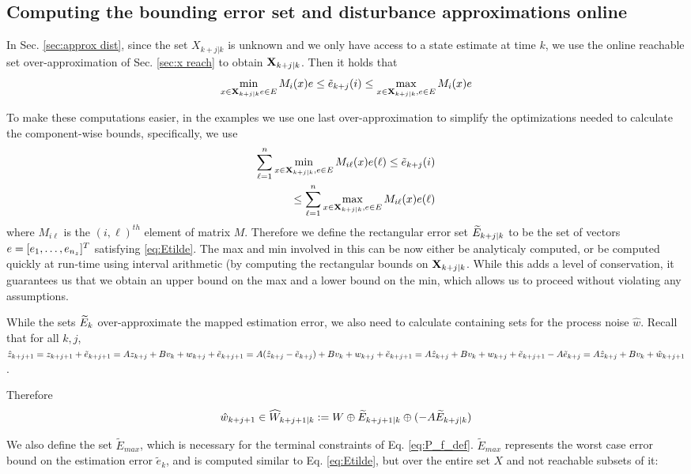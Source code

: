 \subsection{Computing the bounding error set and disturbance approximations online}

In Sec. \ref{sec:approx dist}, since the set $X_{k+j|k}$ is unknown and we only have access to a state estimate at time $k$, we use the online reachable set over-approximation of Sec. \ref{sec:x reach} to obtain $\mathbf{X}_{k+j|k}$.
Then it holds that 
\[\min_{x \in \mathbf{X}_{k+j|k} e \in E}M_i(x)e \leq \tilde{e}_{k+j}(i) \leq \max_{x \in \mathbf{X}_{k+j|k}, e \in E} M_i(x)e\]

To make these computations easier, in the examples we use one last over-approximation to simplify the optimizations needed to calculate the component-wise bounds, specifically, we use 
\begin{eqnarray}
\label{eq:Etilde}
\sum_{\ell=1}^{n} \min_{x \in \mathbf{X}_{k+j|k}, e \in E} M_{i\ell}(x)e(\ell)  \leq \tilde{e}_{k+j}(i) 
\nonumber 
\\
\leq \sum_{\ell=1}^{n} \max_{x \in \mathbf{X}_{k+j|k}, e \in E} M_{i\ell}(x)e(\ell)
\end{eqnarray}
where $M_{i\ell}$ is the $(i,\ell)^{th}$ element of matrix $M$.
Therefore we define the rectangular error set $\widetilde{E}_{k+j|k}$ to be the set of vectors $e = [e_1,\ldots, e_{n_z}]^T$ satisfying \eqref{eq:Etilde}. The max and min involved in this can be now either be analyticaly computed, or be computed quickly at run-time using interval arithmetic (by computing the rectangular bounds on $\mathbf{X}_{k+j|k}$. While this adds a level of conservation, it guarantees us that we obtain an upper bound on the max and a lower bound on the min, which allows us to proceed without violating any assumptions.

While the sets $\widetilde{E}_{k}$ over-approximate the mapped estimation error, we also need to calculate containing sets for the process noise $\hat{w}$.
Recall that for all $k,j$, 
$\hat{z}_{k+j+1} = z_{k+j+1} + \tilde{e}_{k+j+1} = Az_{k+j}+Bv_k+w_{k+j} + \tilde{e}_{k+j+1} =  A(\hat{z}_{k+j} - \tilde{e}_{k+j}) + Bv_k + w_{k+j} + \tilde{e}_{k+j+1} = A\hat{z}_{k+j} + Bv_k + w_{k+j} + \tilde{e}_{k+j+1} - A \tilde{e}_{k+j} = A\hat{z}_{k+j} + Bv_k + \hat{w}_{k+j+1}$.

Therefore 
\begin{equation}
\label{eq:What}
\hat{w}_{k+j+1} \in \widehat{W}_{k+j+1|k} := W \oplus \widetilde{E}_{k+j+1|k} \oplus(-A\widetilde{E}_{k+j|k})
\end{equation}

We also define the set $\tilde{E}_{max}$, which is necessary for the terminal constraints of Eq. \ref{eq:P_f_def}. $\tilde{E}_{max}$ represents the worst case error bound on the estimation error $\tilde{e}_k$, and is computed similar to Eq. \ref{eq:Etilde}, but over the entire set $X$ and not reachable subsets of it:

